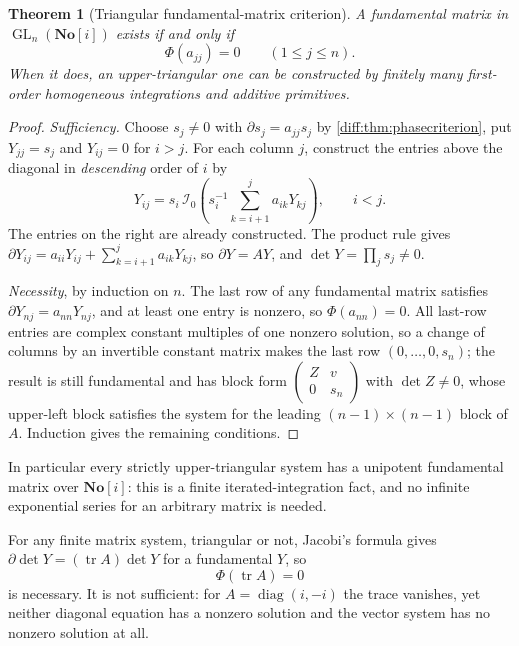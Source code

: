 \documentclass[11pt,letterpaper]{article}
\numberwithin{equation}{section}
\newtheorem{theorem}{Theorem}[section]
\theoremstyle{definition}
\theoremstyle{remark}
\newcommand{\SC}{\mathbf{No}[i]}
\newcommand{\der}{\partial}
\newcommand{\Izero}{\mathcal I_{0}}
\newcommand{\GL}{\operatorname{GL}}
\newcommand{\tr}{\operatorname{tr}}
\begin{document}
\begin{theorem}[Triangular fundamental-matrix criterion]
\label{diff:thm:triangular}
A fundamental matrix in $\GL_{n}(\SC)$ exists if and only if
\begin{equation}\label{diff:eq:diagcriterion}
 \Phi(a_{jj})=0\qquad(1\leq j\leq n).
\end{equation}
When it does, an upper-triangular one can be constructed by finitely many
first-order homogeneous integrations and additive primitives.
\end{theorem}
\begin{proof}
\emph{Sufficiency.} Choose $s_{j}\neq0$ with $\der s_{j}=a_{jj}s_{j}$ by
\cref{diff:thm:phasecriterion}, put $Y_{jj}=s_{j}$ and $Y_{ij}=0$ for $i>j$.
For each column $j$, construct the entries above the diagonal in
\emph{descending} order of $i$ by
\begin{equation}\label{diff:eq:triangularrecursion}
 Y_{ij}=s_{i}\,\Izero\!\left(
 s_{i}^{-1}\sum_{k=i+1}^{j}a_{ik}Y_{kj}\right),\qquad i<j .
\end{equation}
The entries on the right are already constructed. The product rule gives
$\der Y_{ij}=a_{ii}Y_{ij}+\sum_{k=i+1}^{j}a_{ik}Y_{kj}$, so $\der Y=AY$, and
$\det Y=\prod_{j}s_{j}\neq0$.

\emph{Necessity}, by induction on $n$. The last row of any fundamental matrix
satisfies $\der Y_{nj}=a_{nn}Y_{nj}$, and at least one entry is nonzero, so
$\Phi(a_{nn})=0$. All last-row entries are complex constant multiples of one
nonzero solution, so a change of columns by an invertible constant matrix makes
the last row $(0,\dots,0,s_{n})$; the result is still fundamental and has block
form $\begin{pmatrix}Z&v\\0&s_{n}\end{pmatrix}$ with $\det Z\neq0$, whose
upper-left block satisfies the system for the leading
$(n-1)\times(n-1)$ block of $A$. Induction gives the remaining conditions.
\end{proof}

In particular every strictly upper-triangular system has a unipotent
fundamental matrix over $\SC$: this is a finite iterated-integration fact, and
no infinite exponential series for an arbitrary matrix is needed.

\begin{proposition}
\label{diff:prop:trace}
For any finite matrix system, triangular or not, Jacobi's formula gives
$\der\det Y=(\tr A)\det Y$ for a fundamental $Y$, so
\begin{equation}\label{diff:eq:tracenecessary}
 \Phi(\tr A)=0
\end{equation}
is necessary. It is not sufficient: for $A=\operatorname{diag}(i,-i)$ the
trace vanishes, yet neither diagonal equation has a nonzero solution and the
vector system has no nonzero solution at all.
\end{proposition}
\end{document}
